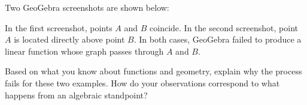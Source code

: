 \documentclass{ximera}
\begin{document}
\begin{problem}\label{prob:systemProblems1}
Two GeoGebra screenshots are shown below:

\begin{center}
  \quad\quad
    \end{center}

In the first screenshot, points $A$ and $B$ coincide.  In the second screenshot, point $A$ is located directly above point $B$. 
In both cases, GeoGebra failed to produce a linear function whose graph passes through $A$ and $B$.

Based on what you know about functions and geometry, explain why the process fails for these two examples. How do your observations correspond to what happens from an algebraic standpoint?

\begin{multipleChoice}
\end{multipleChoice}
\end{problem}
\end{document}
